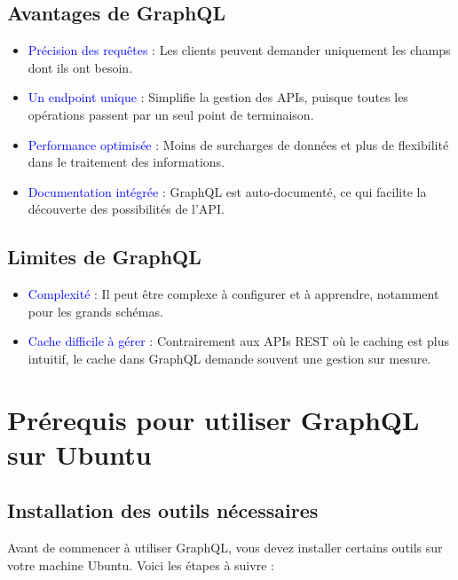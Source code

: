 \documentclass{article}
\begin{document}
\subsection{Avantages de GraphQL}
\begin{itemize}
    \item \textcolor{blue}{Précision des requêtes} : Les clients peuvent demander uniquement les champs dont ils ont besoin.
    \item \textcolor{blue}{Un endpoint unique} : Simplifie la gestion des APIs, puisque toutes les opérations passent par un seul point de terminaison.
    \item \textcolor{blue}{Performance optimisée} : Moins de surcharges de données et plus de flexibilité dans le traitement des informations.
    \item \textcolor{blue}{Documentation intégrée} : GraphQL est auto-documenté, ce qui facilite la découverte des possibilités de l'API.
\end{itemize}

\subsection{Limites de GraphQL}
\begin{itemize}
    \item \textcolor{blue}{Complexité} : Il peut être complexe à configurer et à apprendre, notamment pour les grands schémas.
    \item \textcolor{blue}{Cache difficile à gérer} : Contrairement aux APIs REST où le caching est plus intuitif, le cache dans GraphQL demande souvent une gestion sur mesure.
\end{itemize}

\section{Prérequis pour utiliser GraphQL sur Ubuntu}
\subsection{Installation des outils nécessaires}
Avant de commencer à utiliser GraphQL, vous devez installer certains outils sur votre machine Ubuntu. Voici les étapes à suivre :
\end{document}
